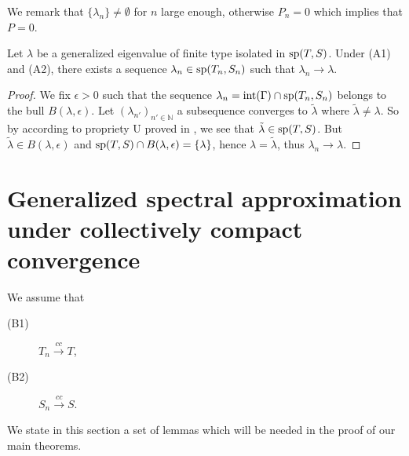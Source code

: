 \documentclass[
11pt,%
tightenlines,%
twoside,%
onecolumn,%
nofloats,%
nobibnotes,%
nofootinbib,%
superscriptaddress,%
noshowpacs,%
centertags]%
{revtex4}
\def\sp{\mathop{\rm sp}\nolimits}
\begin{document}
We remark that $\{\lambda_n\}\neq\emptyset$ for $n$ large enough, otherwise $P_n=0$ which implies that $P=0$.
\begin{corollary}
Let $\lambda$ be  a generalized eigenvalue of finite type isolated in $\sp(T,S)$. Under (A1) and (A2), there exists a sequence $\lambda_n\in\sp(T_n,S_n)$ such that $\lambda_n\rightarrow\lambda$.
\end{corollary}
\begin{proof}
We fix $\epsilon>0$ such that the sequence $\lambda_n=\mbox{int}(\Gamma)\cap\sp(T_n,S_n)$ belongs to the bull $B(\lambda,\epsilon)$. Let $(\lambda_{n'})_{n'\in \mathbb{N}}$  a subsequence converges to $\tilde{\lambda}$ where $\tilde{\lambda}\neq\lambda$. So by according to propriety U proved in \cite{bib16}, we see that $\tilde{\lambda}\in \sp(T,S)$. But $\tilde{\lambda}\in B(\lambda,\epsilon)$ and $\sp(T,S)\cap B(\lambda,\epsilon)=\{\lambda\}$, hence $\lambda=\tilde{\lambda}$, thus $\lambda_n\rightarrow\lambda$.
\end{proof}

\section{Generalized spectral approximation under collectively compact convergence}
We assume that
\begin{description}
  \item[(B1)] $T_n\stackrel{cc}{\longrightarrow}T$,
  \item[(B2)] $S_n\stackrel{cc}{\longrightarrow}S$.
\end{description}\par
We state in this section a set of lemmas which will be needed in the proof of our main theorems.
\end{document}

